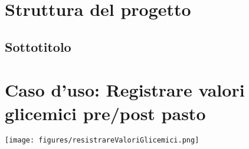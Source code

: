 \section{Struttura del progetto}

\subsection{Sottotitolo}

\section*{Caso d'uso: Registrare valori glicemici pre/post pasto}

\texttt{[image: figures/resistrareValoriGlicemici.png]}